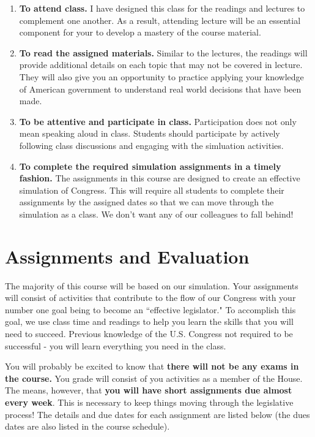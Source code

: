 \documentclass[11pt]{article}
\begin{document}
\begin{enumerate}
	\item \textbf{To attend class.} I have designed this class for the readings and lectures to complement one another. As a result, attending lecture will be an essential component for your to develop a mastery of the course material. 
	\item \textbf{To read the assigned materials.} Similar to the lectures, the readings will provide additional details on each topic that may not be covered in lecture. They will also give you an opportunity to practice applying your knowledge of American government to understand real world decisions that have been made.
	\item \textbf{To be attentive and participate in class.} Participation does not only mean speaking aloud in class. Students should participate by actively following class discussions and engaging with the simluation activities. 
	\item \textbf{To complete the required simulation assignments in a timely fashion.} The assignments in this course are designed to create an effective simulation of Congress. This will require all students to complete their assignments by the assigned dates so that we can move through the simulation as a class. We don't want any of our colleagues to fall behind!
\end{enumerate}


\section*{Assignments and Evaluation}

The majority of this course will be based on our simulation. Your assignments will consist of activities that contribute to the flow of our Congress with your number one goal being to become an ``effective legislator." To accomplish this goal, we use class time and readings to help you learn the skills that you will need to succeed. Previous knowledge of the U.S. Congress not required to be successful - you will learn everything you need in the class. 

You will probably be excited to know that \textbf{there will not be any exams in the course.} You grade will consist of you activities as a member of the House. The means, however, that \textbf{you will have short assignments due almost every week}. This is necessary to keep things moving through the legislative process! The details and due dates for each assignment are listed below (the dues dates are also listed in the course schedule). 
\end{document}
